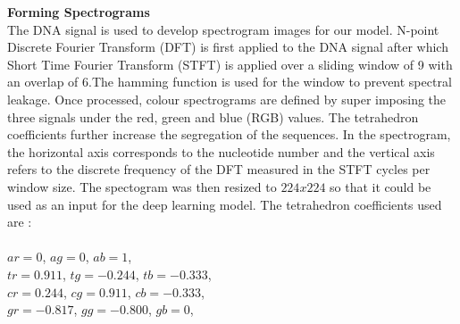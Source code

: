 \documentclass{article}
\begin{document}
\textbf{Forming Spectrograms}\\
The DNA signal is used to develop spectrogram images for our model. N-point Discrete Fourier Transform (DFT) is first applied to the DNA signal after which Short Time Fourier Transform (STFT) is applied over a sliding window of 9 with an overlap of 6.The hamming function \citep{1455106}is used for the window to prevent spectral leakage. Once processed, colour spectrograms are defined by super imposing the three signals under the red, green and blue (RGB) values. The tetrahedron coefficients further increase the segregation of the sequences. In the spectrogram, the horizontal axis corresponds to the nucleotide number and the vertical axis refers to the discrete frequency of the DFT measured in the STFT cycles per window size. The spectogram was then resized to $224x224$ so that it could be used as an input for the deep learning model.
The tetrahedron coefficients used are : \\ \\
$ar = 0$,
$ag = 0$,
$ab = 1$,\\
$tr = 0.911$,
$tg = -0.244$,
$tb = -0.333$,\\
$cr = 0.244$,
$cg = 0.911$,
$cb = -0.333$,\\
$gr = -0.817$,
$gg = -0.800$,
$gb = 0$,\\
\end{document}
